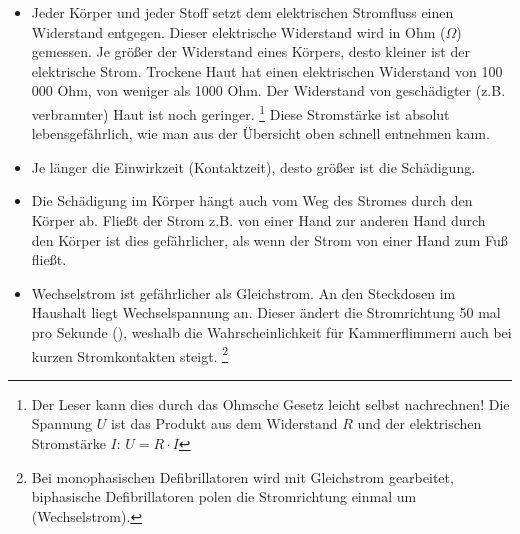 \begin{itemize}
{\begin{itemize}
		\item Bei Stromstärken  kommt es aufgrund der Muskelkontraktionen zu krampfhaften Festhalten der berührten Stromquelle. \cite{BoehmerTaschRett6}
		\item Stromstärken  sind ! \cite{BoehmerTaschRett6}
		\item Stromstärken  führen zu Atemlähmungen und Kammerflimmern! \cite{Jaros1}
		\item Stromstärken  führen zusätzlich zu Verbrennungen, Verkochungen und Verkohlungen. \cite{LPN3}
		\end{itemize}
}
	\item {} Jeder Körper und
	jeder Stoff setzt dem elektrischen Stromfluss einen
	Widerstand entgegen. Dieser elektrische Widerstand wird in
	Ohm ($\Omega$) gemessen. Je größer der Widerstand eines
	Körpers, desto kleiner ist der elektrische Strom. Trockene
	Haut hat einen elektrischen Widerstand von 100 000 Ohm,
	 von
	weniger als 1000 Ohm. Der Widerstand von geschädigter
	(z.B. verbrannter) Haut ist noch geringer. \footnote{Der Leser kann dies durch das Ohmsche Gesetz leicht selbst nachrechnen! Die Spannung $U$ ist das Produkt aus dem Widerstand $R$ und der elektrischen Stromstärke $I$: $U=R \cdot I$} Diese Stromstärke ist absolut lebensgefährlich, wie man aus der Übersicht oben schnell entnehmen kann.
	\item {} Je länger die Einwirkzeit (Kontaktzeit), desto größer ist die Schädigung.
	\item {} Die Schädigung im Körper hängt auch vom Weg des Stromes durch den Körper ab. Fließt der Strom z.B. von einer Hand zur anderen Hand durch den Körper ist dies gefährlicher, als wenn der Strom von einer Hand zum Fuß fließt.
	\item {} Wechselstrom ist gefährlicher als Gleichstrom. An den Steckdosen im Haushalt liegt Wechselspannung an. Dieser ändert die Stromrichtung 50 mal pro Sekunde (), weshalb die Wahrscheinlichkeit für Kammerflimmern auch bei kurzen Stromkontakten steigt. \cite{RedelsteinerHRNS1} \footnote{Bei monophasischen Defibrillatoren wird mit Gleichstrom gearbeitet, biphasische Defibrillatoren polen die Stromrichtung einmal um (Wechselstrom).} 
\end{itemize}


